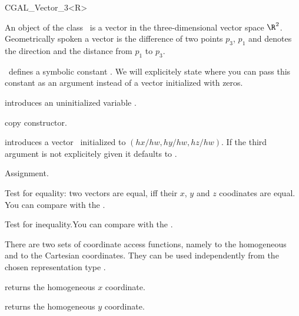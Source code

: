 
\begin {classtemplate} {CGAL_Vector_3<R>}


An object of the class \classname\ is a vector in the three-dimensional 
vector space $\R^2$. Geometrically spoken a vector is the difference
of two points $p_3$, $p_1$ and denotes the direction and the distance
from   $p_1$ to $p_3$. 

\cgal\ defines a symbolic constant . We 
will explicitely state where you can pass this constant as an argument
instead of a vector initialized with zeros.


\creation
{}


\hidden{}
             {introduces an uninitialized variable \var.}

\hidden {}
 	    {copy constructor.}

            {introduces a vector \var\ initialized to $(hx/hw, hy/hw, hz/hw)$.
             If the third argument is not explicitely given it defaults
             to .}


\operations
\threecolumns{5cm}{4cm}

\hidden {}
        {Assignment.}

       {Test for equality: two vectors are equal, iff their $x$, $y$ 
        and $z$ coodinates are equal. You can compare with the
        .}

       {Test for inequality.You can compare with the
        .}


There are two sets of coordinate access functions, namely to the
homogeneous and to the Cartesian coordinates. They can be used
independently from the chosen representation type .

       {returns the homogeneous $x$ coordinate.}

       {returns the homogeneous $y$ coordinate.}


\end{classtemplate}
